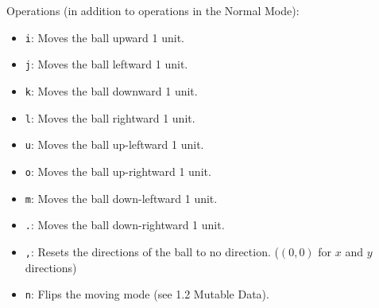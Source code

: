 \documentclass{article}
\newcommand{\code}[1]{\texttt{#1}}
\begin{document}
Operations (in addition to operations in the Normal Mode):
\begin{itemize}
    \item \code{i}: Moves the ball upward 1 unit. 
    \item \code{j}: Moves the ball leftward 1 unit. 
    \item \code{k}: Moves the ball downward 1 unit. 
    \item \code{l}: Moves the ball rightward 1 unit. 
    \item \code{u}: Moves the ball up-leftward 1 unit. 
    \item \code{o}: Moves the ball up-rightward 1 unit. 
    \item \code{m}: Moves the ball down-leftward 1 unit. 
    \item \code{.}: Moves the ball down-rightward 1 unit. 
    \item \code{,}: Resets the directions of the ball to no direction. ($(0, 0)$ for $x$ and $y$ directions)
    \item \code{n}: Flips the moving mode (see 1.2 Mutable Data). 
\end{itemize}
\end{document}
